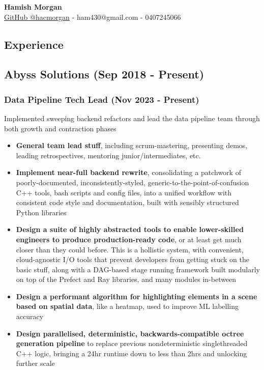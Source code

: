 \documentclass[12pt]{article}
\begin{document}
\begin{center}
  \Large
  \vspace{0.8cm}
  \textbf{Hamish Morgan}\\
  \vspace{0.8cm}
  \large
  \href{https://github.com/hacmorgan}{GitHub @hacmorgan} - ham430@gmail.com - 0407245066

\end{center}


\begin{FlushLeft}

  \section{Experience}

  \subsection{Abyss Solutions (Sep 2018 - Present)}

  \subsubsection{Data Pipeline Tech Lead (Nov 2023 - Present)}
  Implemented sweeping backend refactors and lead the data pipeline team through both growth and contraction phases \\

  \begin{itemize}
  \item \textbf{General team lead stuff}, including scrum-mastering, presenting demos, leading retrospectives, mentoring junior/intermediates, etc. \\
  \item \textbf{Implement near-full backend rewrite}, consolidating a patchwork of poorly-documented, inconsistently-styled, generic-to-the-point-of-confusion C++ tools, bash scripts and config files, into a unified workflow with consistent code style and documentation, built with sensibly structured Python libraries \\
  \item \textbf{Design a suite of highly abstracted tools to enable lower-skilled engineers to produce production-ready code}, or at least get much closer than they could before. This is a hollistic system, with convenient, cloud-agnostic I/O tools that prevent developers from getting stuck on the basic stuff, along with a DAG-based stage running framework built modularly on top of the Prefect and Ray libraries, and many modules in-between \\
  \item \textbf{Design a performant algorithm for highlighting elements in a scene based on spatial data}, like a heatmap, used to improve ML labelling accuracy \\
  \item \textbf{Design parallelised, deterministic, backwards-compatible octree generation pipeline} to replace previous nondeterministic singlethreaded C++ logic, bringing a 24hr runtime down to less than 2hrs and unlocking further scale \\
  \end{itemize}


\end{FlushLeft}
\end{document}
